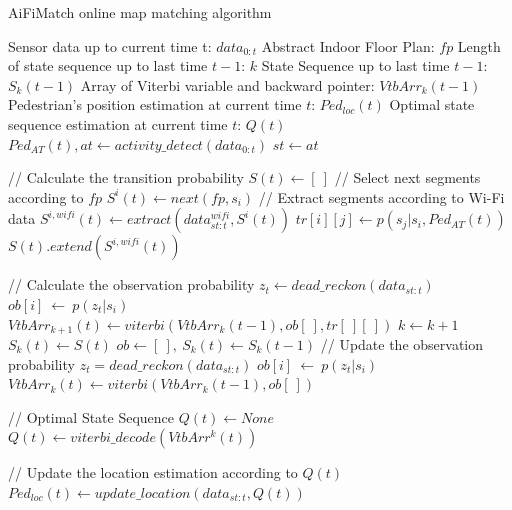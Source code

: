 \documentclass[conference]{IEEEtran}
\begin{document}
\begin{algorithm}[H]
	\caption{AiFiMatch online map matching algorithm}
	\label{alg_aifi}
	\begin{algorithmic}[1]
		\renewcommand{\algorithmicrequire}{\textbf{Input:}}
		\renewcommand{\algorithmicensure}{\textbf{Output:}}
		\REQUIRE Sensor data up to current time t: $data_{0:t}$
		\REQUIRE Abstract Indoor Floor Plan: $fp$
		\REQUIRE Length of state sequence up to last time $t-1$: $k$
		\REQUIRE State Sequence up to last time $t-1$: $S_{k}(t-1)$
		\REQUIRE Array of Viterbi variable and backward pointer: ${VtbArr}_{k}(t-1)$
		\ENSURE Pedestrian's position estimation at current time $t$: $Ped_{loc}(t)$
		\ENSURE Optimal state sequence estimation at current time $t$: $Q(t)$
		\STATE ${Ped_{AT}(t)}, at \leftarrow activity\_detect({data_{0:t}})$
		    \STATE ${st} \leftarrow {at}$  
		    
		    \STATE // Calculate the transition probability
		    \STATE $S(t) \leftarrow [\ ]$
			    \STATE // Select next segments according to $fp$
			    \STATE $S^{i}(t) \leftarrow next(fp,s_i)$
			    \STATE // Extract segments according to Wi-Fi data
			    \STATE $S^{i,wifi}(t) \leftarrow extract(data_{st:t}^{wifi},S^{i}(t))$
			        \STATE $tr[i][j] \leftarrow p(s_j|s_i,{Ped_{AT}(t)})$
			    \ENDFOR
			    \STATE $S(t).extend(S^{i,wifi}(t))$
		    \ENDFOR
		    
		    \STATE // Calculate the observation probability		    
		    \STATE ${z_t} \leftarrow dead\_reckon(data_{st:t})$
		    \STATE $ob[i]\ \leftarrow\ p(z_t|s_i)$
		    \ENDFOR
		    \STATE ${VtbArr}_{k+1}(t) \leftarrow viterbi({VtbArr}_{k}(t-1), ob[\ ], tr[\ ][\ ])$
		    \STATE $k \leftarrow k+1$
		    \STATE $S_{k}(t) \leftarrow S(t)$
		\ELSE
		    \STATE $ob \leftarrow [\ ],\ S_{k}(t) \leftarrow S_{k}(t-1)$
		    \STATE // Update the observation probability
		    \STATE ${z_t}=dead\_reckon(data_{st:t})$
		        \STATE $ob[i]\ \leftarrow\ p(z_t|s_i)$
		    \ENDFOR
		    \STATE ${VtbArr}_{k}(t) \leftarrow viterbi({VtbArr}_{k}(t-1), ob[\ ])$
		\ENDIF	
		
		\STATE // Optimal State Sequence
		\STATE ${Q(t)} \leftarrow None$
		    \STATE ${Q(t)} \leftarrow viterbi\_decode(VtbArr^{k}(t))$
		\ENDIF
		
		\STATE // Update the location estimation according to $Q(t)$
		\STATE $Ped_{loc}(t) \leftarrow update\_location(data_{st:t}, Q(t))$
	\end{algorithmic}
\end{algorithm}
\end{document}
